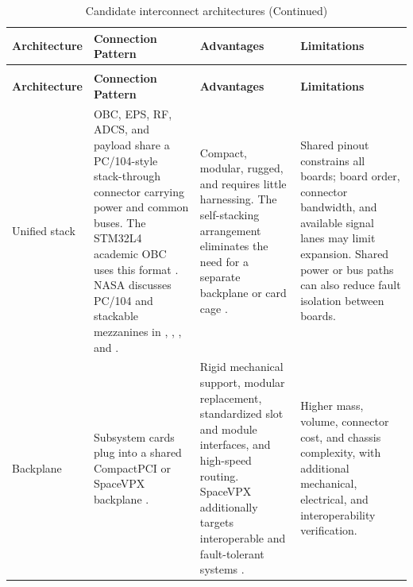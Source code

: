 \documentclass[10pt]{../datasheet}
\let\cite\citep
\begin{document}
\renewcommand{\arraystretch}{1.15}
\begin{longtable}{|
  >{\raggedright\arraybackslash}p{3.0cm}|
  >{\raggedright\arraybackslash}p{4.5cm}|
  >{\raggedright\arraybackslash}p{4.1cm}|
  >{\raggedright\arraybackslash}p{4.0cm}|}
  \caption{Candidate interconnect architectures} \label{tab:interconnect_architectures} \\ \hline
  \textbf{Architecture}                                          &
  \textbf{Connection Pattern}                                    &
  \textbf{Advantages}                                            &
  \textbf{Limitations}                                                                  \\ \hline
  \endfirsthead
  \caption[]{Candidate interconnect architectures (Continued)}                          \\ \hline
  \textbf{Architecture}                                          &
  \textbf{Connection Pattern}                                    &
  \textbf{Advantages}                                            &
  \textbf{Limitations}                                                                  \\ \hline
  \endhead
  \hline
  \endfoot

  Unified stack                                                  &
  OBC, EPS, RF, ADCS, and payload share a PC/104-style stack-through connector
  carrying power and common buses. The STM32L4 academic OBC uses this format
  \cite{stm32l4_vst104_pub}. NASA discusses PC/104 and stackable mezzanines in
  \cite[p.~210]{nasa_soa_2022},
  \cite[pp.~226--227]{nasa_soa_2023},
  \cite[pp.~229--230]{nasa_soa_2024}, and
  \cite[p.~222]{nasa_soa_2026}.                                  &
  Compact, modular, rugged, and requires little harnessing. The self-stacking
  arrangement eliminates the need for a separate backplane or card cage
  \cite{pc104_standard}.                                         &
  Shared pinout constrains all boards; board order, connector bandwidth, and
  available signal lanes may limit expansion. Shared power or bus paths can
  also reduce fault isolation between boards.                                           \\ \hline

  Backplane                                                      &
  Subsystem cards plug into a shared CompactPCI or SpaceVPX backplane
  \cite[p.~210]{nasa_soa_2022}
  \cite[p.~226]{nasa_soa_2023}
  \cite[p.~229]{nasa_soa_2024}
  \cite[p.~222]{nasa_soa_2026}.                                  &
  Rigid mechanical support, modular replacement, standardized slot and module
  interfaces, and high-speed routing. SpaceVPX additionally targets
  interoperable and fault-tolerant systems \cite{vita_spacevpx}. &
  Higher mass, volume, connector cost, and chassis complexity, with additional
  mechanical, electrical, and interoperability verification.                            \\ \hline


\end{longtable}
\end{document}
